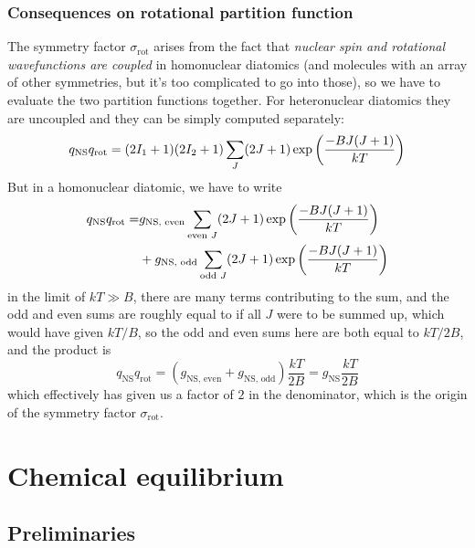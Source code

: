 \subsubsection{Consequences on rotational partition function}
The symmetry factor $\sigma_{\text{rot}}$ arises from the fact that \emph{nuclear spin and rotational wavefunctions are coupled} in homonuclear diatomics (and molecules with an array of other symmetries, but it's too complicated to go into those), so we have to evaluate the two partition functions together. For heteronuclear diatomics they are uncoupled and they can be simply computed separately:
\begin{equation}
  q_{\text{NS}}q_{\text{rot}}=(2I_1+1)(2I_2+1)\sum_J(2J+1)\exp\left(\frac{-BJ(J+1)}{kT} \right)
\end{equation}
But in a homonuclear diatomic, we have to write
\begin{equation}
\begin{aligned}
  q_{\text{NS}}q_{\text{rot}}=&g_{\text{NS, even}}\sum_{\text{even }J}(2J+1)\exp\left(\frac{-BJ(J+1)}{kT} \right)\\
&+g_{\text{NS, odd}}\sum_{\text{odd }J}(2J+1)\exp\left(\frac{-BJ(J+1)}{kT} \right)
\end{aligned}
\end{equation}
in the limit of $kT\gg B$, there are many terms contributing to the sum, and the odd and even sums are roughly equal to if all $J$ were to be summed up, which would have given $kT/B$, so the odd and even sums here are both equal to $kT/2B$, and the product is
\begin{equation}
  q_{\text{NS}}q_{\text{rot}}=(g_{\text{NS, even}}+g_{\text{NS, odd}})\frac{kT}{2B}=g_{\text{NS}}\frac{kT}{2B}
\end{equation}
which effectively has given us a factor of $2$ in the denominator, which is the origin of the symmetry factor $\sigma_{\text{rot}}$.

\section{Chemical equilibrium}
\subsection{Preliminaries}
